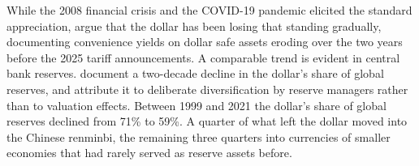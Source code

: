 While the 2008 financial crisis and the COVID-19 pandemic elicited the standard appreciation, \textcite{jiang_krishnamurthy_lustig_richmond_2026} argue that the dollar has been losing that standing gradually, documenting convenience yields on dollar safe assets eroding over the two years before the 2025 tariff announcements. A comparable trend is evident in central bank reserves. \textcite{arslanalp_eichengreen_simpsonbell_2022} document a two-decade decline in the dollar's share of global reserves, and attribute it to deliberate diversification by reserve managers rather than to valuation effects. Between 1999 and 2021 the dollar's share of global reserves declined from 71\% to 59\%. A quarter of what left the dollar moved into the Chinese renminbi, the remaining three quarters into currencies of smaller economies that had rarely served as reserve assets before.




